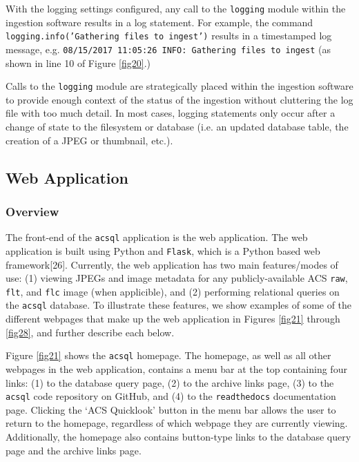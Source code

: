 \documentclass[10pt,journal,compsoc]{IEEEtran}
\begin{document}
With the logging settings configured, any call to the \texttt{logging} module within the ingestion software results in a log statement.  For example, the command
\texttt{logging.info('Gathering files to ingest')} results in a timestamped log message, e.g. \texttt{08/15/2017 11:05:26 INFO: Gathering files to ingest} (as shown in line 10 of Figure \ref{fig20}.)

Calls to the \texttt{logging} module are strategically placed within the ingestion software to provide enough context of the status of the ingestion without cluttering the log file with
too much detail. In most cases, logging statements only occur after a change of state to the filesystem or database (i.e. an updated database table, the creation of a JPEG or thumbnail, etc.).


\subsection{Web Application} \label{sec3.9}


\subsubsection{Overview}

The front-end of the \texttt{acsql} application is the web application.  The web application is built using Python and \texttt{Flask}, which is a Python based web framework[26].
Currently, the web application has two main features/modes of use: (1) viewing JPEGs and image metadata for any publicly-available ACS \texttt{raw}, \texttt{flt}, and \texttt{flc} image
(when applicible), and (2) performing relational queries on the \texttt{acsql} database.  To illustrate these features, we show examples of some of the different webpages that make up the
web application in Figures \ref{fig21} through \ref{fig28}, and further describe each below.

Figure \ref{fig21} shows the \texttt{acsql} homepage.  The homepage, as well as all other webpages in the web application, contains a menu bar at the top containing four links:
(1) to the database query page, (2) to the archive links page, (3) to the \texttt{acsql} code repository on GitHub, and (4) to the \texttt{readthedocs} documentation page.  Clicking the
`ACS Quicklook' button in the menu bar allows the user to return to the homepage, regardless of which webpage they are currently viewing.  Additionally, the homepage also contains button-type
links to the database query page and the archive links page.
\end{document}
